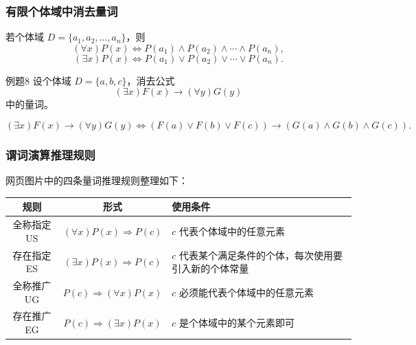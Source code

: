 \subsubsection{有限个体域中消去量词}

若个体域 \(D=\{a_1,a_2,\dots,a_n\}\)，则
\[
(\forall x)P(x)\Leftrightarrow P(a_1)\land P(a_2)\land\cdots\land P(a_n),
\]
\[
(\exists x)P(x)\Leftrightarrow P(a_1)\lor P(a_2)\lor\cdots\lor P(a_n).
\]

\begin{question}{例题8}
	设个体域 \(D=\{a,b,c\}\)，消去公式
	\[
	(\exists x)F(x)\to(\forall y)G(y)
	\]
	中的量词。
	
	\begin{solution}
	\[
	(\exists x)F(x)\to(\forall y)G(y)
	\Leftrightarrow
	(F(a)\lor F(b)\lor F(c))\to(G(a)\land G(b)\land G(c)).
	\]
	\end{solution}
\end{question}

\subsubsection{谓词演算推理规则}

网页图片中的四条量词推理规则整理如下：

\begin{center}
	\begin{tabular}{ccp{8cm}}
		\toprule
		规则 & 形式 & 使用条件\\
		\midrule
		全称指定 US & \((\forall x)P(x)\Rightarrow P(c)\) & \(c\) 代表个体域中的任意元素\\
		存在指定 ES & \((\exists x)P(x)\Rightarrow P(c)\) & \(c\) 代表某个满足条件的个体，每次使用要引入新的个体常量\\
		全称推广 UG & \(P(c)\Rightarrow(\forall x)P(x)\) & \(c\) 必须能代表个体域中的任意元素\\
		存在推广 EG & \(P(c)\Rightarrow(\exists x)P(x)\) & \(c\) 是个体域中的某个元素即可\\
		\bottomrule
	\end{tabular}
\end{center}

